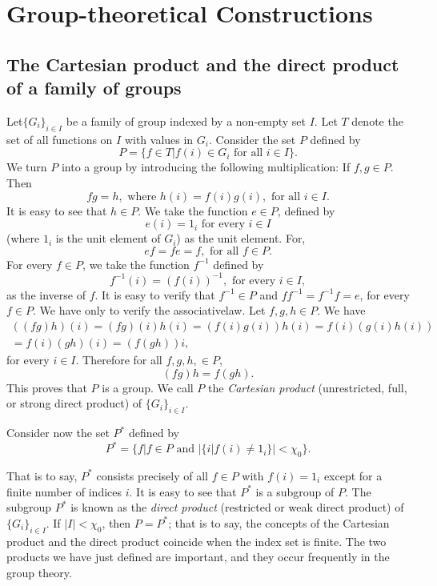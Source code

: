 
\chapter{Group-theoretical Constructions}\label{chap6}%

\section[The Cartesian product and the...]{The Cartesian product and the direct product of a family of
  groups}\label{chap6:sec1}%

Let\pageoriginale $\bigg \{G_i\bigg\}_{i \in  I}$ be a family of group
indexed by a non-empty set $I$. Let $T$ denote the set of all
functions on $I$ with values in $G_i$. Consider the set $P$ defined by  
$$
P = \Bigg \{ f \in  T \bigg | f(i) \in  G_i \text{ for
  all } i \in  I \Bigg \}. 
$$
We turn $P$ into a group by introducing the following multiplication:
If $f, g \in  P$. Then 
$$
fg = h, \text{ where } h(i) = f(i) g(i), \text{ for all } i \in  I.
$$
It is easy to see that $h \in  P$. We take the function $e
\in  P$, defined by  
$$
e(i) = 1_i \text{ for every } i \in  I
$$
(where $1_i$ is the unit element of $G_i$) as the unit element. For, 
$$
ef = fe = f, \text{ for all } f \in  P.
$$
For every $f \in  P$, we take the function $f^{-1}$ defined by 
$$
f^{-1}(i) = (f(i))^{-1}, \text{ for every } i \in  I,
$$
as the inverse of $f$. It is easy to verify that $f^{-1} \in 
P$ and $ff^{-1} = f^{-1} f = e$, for every $f \in  P$. We have
only to verify the associative\pageoriginale law. Let $f, g, h \in  P$. We
have 
\begin{gather*}
  ((fg)h)(i) = (fg)(i)h(i) = (f(i)g(i))h(i) = f(i)(g(i)h(i)) \\
  = f(i)(gh)(i) = (f(gh))i,
\end{gather*}
for every $i \in  I$. Therefore for all $f, g, h, \in P$,
$$
(fg)h = f(gh).
$$
This proves that $P$ is a group. We call $P$ the \textit{Cartesian
  product} (unrestricted, full, or strong direct product) of
$\bigg\{G_i\bigg \}_{i \in  I}$. 

Consider now the set $P^*$ defined by
$$
P^* = \Bigg \{ f \Bigg | f \in  P \text{ and }\bigg|\bigg\{ i
\bigg| f(i) \neq 1_i \bigg\} \bigg | < \chi_0\Bigg\}. 
$$

That is to say, $P^*$ consists precisely of all $f \in  P$ with
$f(i)=1_i$ except for a finite number of indices $i$. It is easy to
see that $P^*$ is a subgroup of $P$. The subgroup $P^*$ is known as
the \textit{direct product} (restricted or weak direct product) of
$\bigg\{G_i\bigg\}_{i \in  I}$. If $| I | < \chi_0$, then $P =
P^*$; that is to say, the concepts of the Cartesian product and the
direct product coincide when the index set is finite. The two products
we have just defined are important, and they occur frequently in the
group theory. 

